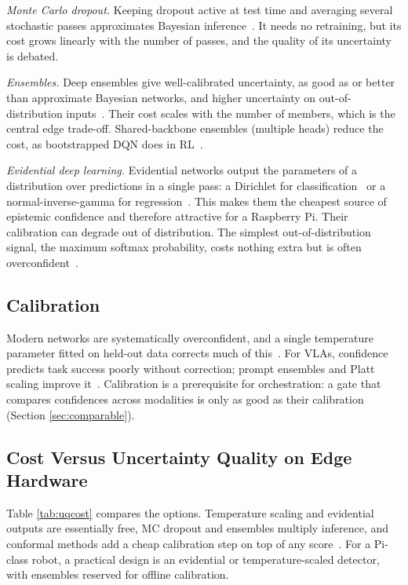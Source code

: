 \documentclass[journal]{IEEEtran}
\begin{document}
\textit{Monte Carlo dropout.} Keeping dropout active at test time and averaging several stochastic passes approximates Bayesian inference~\cite{Gal2016}. It needs no retraining, but its cost grows linearly with the number of passes, and the quality of its uncertainty is debated.

\textit{Ensembles.} Deep ensembles give well-calibrated uncertainty, as good as or better than approximate Bayesian networks, and higher uncertainty on out-of-distribution inputs~\cite{Lakshminarayanan2017}. Their cost scales with the number of members, which is the central edge trade-off. Shared-backbone ensembles (multiple heads) reduce the cost, as bootstrapped DQN does in RL~\cite{Osband2016}.

\textit{Evidential deep learning.} Evidential networks output the parameters of a distribution over predictions in a single pass: a Dirichlet for classification~\cite{Sensoy2018} or a normal-inverse-gamma for regression~\cite{Amini2020}. This makes them the cheapest source of epistemic confidence and therefore attractive for a Raspberry Pi. Their calibration can degrade out of distribution. The simplest out-of-distribution signal, the maximum softmax probability, costs nothing extra but is often overconfident~\cite{Hendrycks2017}.


\subsection{Calibration}\label{sec:calibration}
Modern networks are systematically overconfident, and a single temperature parameter fitted on held-out data corrects much of this~\cite{Guo2017}. For VLAs, confidence predicts task success poorly without correction; prompt ensembles and Platt scaling improve it~\cite{Zollo2025}. Calibration is a prerequisite for orchestration: a gate that compares confidences across modalities is only as good as their calibration (Section \ref{sec:comparable}).


\subsection{Cost Versus Uncertainty Quality on Edge Hardware}\label{sec:uqcost}
Table \ref{tab:uqcost} compares the options. Temperature scaling and evidential outputs are essentially free, MC dropout and ensembles multiply inference, and conformal methods add a cheap calibration step on top of any score~\cite{Ren2023}. For a Pi-class robot, a practical design is an evidential or temperature-scaled detector, with ensembles reserved for offline calibration.
\end{document}
